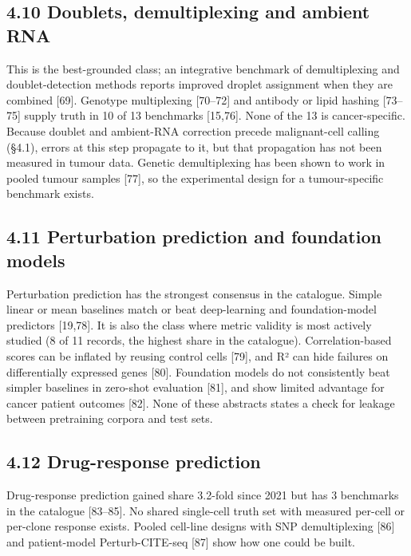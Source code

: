 \documentclass[11pt]{article}
\begin{document}
\subsection{4.10 Doublets, demultiplexing and ambient RNA}\label{doublets-demultiplexing-and-ambient-rna}

This is the best-grounded class; an integrative benchmark of
demultiplexing and doublet-detection methods reports improved droplet
assignment when they are combined {[}69{]}. Genotype multiplexing
{[}70--72{]} and antibody or lipid hashing {[}73--75{]} supply truth in
10 of 13 benchmarks {[}15,76{]}. None of the 13 is cancer-specific.
Because doublet and ambient-RNA correction precede malignant-cell
calling (§4.1), errors at this step propagate to it, but that
propagation has not been measured in tumour data. Genetic demultiplexing
has been shown to work in pooled tumour samples {[}77{]}, so the
experimental design for a tumour-specific benchmark exists.

\subsection{4.11 Perturbation prediction and foundation models}\label{perturbation-prediction-and-foundation-models}

Perturbation prediction has the strongest consensus in the catalogue.
Simple linear or mean baselines match or beat deep-learning and
foundation-model predictors {[}19,78{]}. It is also the class where
metric validity is most actively studied (8 of 11 records, the highest
share in the catalogue). Correlation-based scores can be inflated by
reusing control cells {[}79{]}, and R² can hide failures on
differentially expressed genes {[}80{]}. Foundation models do not
consistently beat simpler baselines in zero-shot evaluation {[}81{]},
and show limited advantage for cancer patient outcomes {[}82{]}. None of
these abstracts states a check for leakage between pretraining corpora
and test sets.

\subsection{4.12 Drug-response prediction}\label{drug-response-prediction}

Drug-response prediction gained share 3.2-fold since 2021 but has 3
benchmarks in the catalogue {[}83--85{]}. No shared single-cell truth
set with measured per-cell or per-clone response exists. Pooled
cell-line designs with SNP demultiplexing {[}86{]} and patient-model
Perturb-CITE-seq {[}87{]} show how one could be built.
\end{document}
